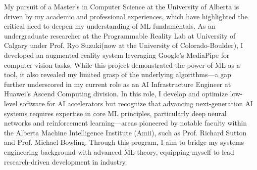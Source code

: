 \documentclass{article}
\newcommand{\school}{University of Alberta\xspace}
\begin{document}


My pursuit of a Master's in Computer Science at the University of Alberta is driven by my academic and professional experiences, which have highlighted the critical need to deepen my understanding of ML fundamentals. As an undergraduate researcher at the Programmable Reality Lab at University of Calgary under Prof. Ryo Suzuki(now at the University of Colorado-Boulder), I developed an augmented reality system leveraging Google's MediaPipe for computer vision tasks. While this project demonstrated the power of ML as a tool, it also revealed my limited grasp of the underlying algorithms—a gap further underscored in my current role as an AI Infrastructure Engineer at Huawei's Ascend Computing division. In this role, I develop and optimize low-level software for AI accelerators but recognize that advancing next-generation AI systems requires expertise in core ML principles, particularly deep neural networks and reinforcement learning—areas pioneered by notable faculty within the Alberta Machine Intelligence Institute (Amii), such as Prof. Richard Sutton and Prof. Michael Bowling. Through this program, I aim to bridge my systems engineering background with advanced ML theory, equipping myself to lead research-driven development in industry.
\end{document}
